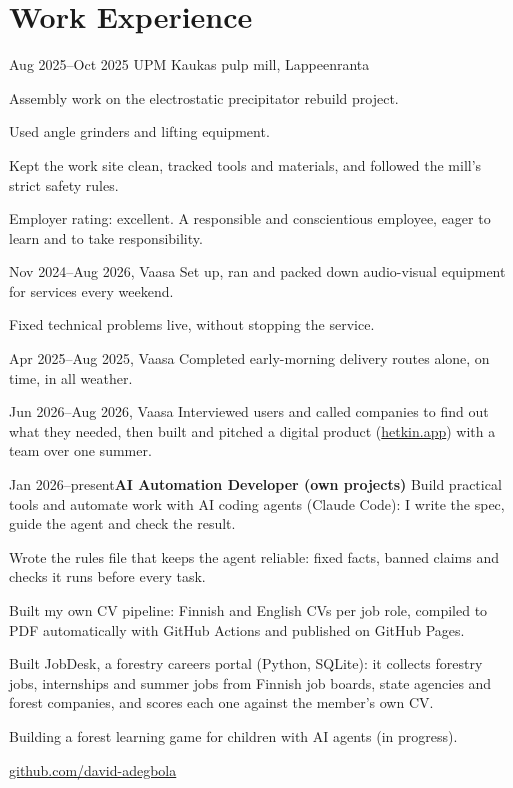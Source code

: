 \documentclass[a4paper,11pt]{article}
\begin{document}
\section{Work Experience}
\begin{cventry}{Aug 2025--Oct 2025}{}
  UPM Kaukas pulp mill, Lappeenranta\par
  Assembly work on the electrostatic precipitator rebuild project.\par
  Used angle grinders and lifting equipment.\par
  Kept the work site clean, tracked tools and materials, and followed the mill's strict safety rules.\par
  Employer rating: excellent. A responsible and conscientious employee, eager to learn and to take responsibility.
\end{cventry}
\begin{cventry}{Nov 2024--Aug 2026}{, Vaasa}
  Set up, ran and packed down audio-visual equipment for services every weekend.\par
  Fixed technical problems live, without stopping the service.
\end{cventry}
\begin{cventry}{Apr 2025--Aug 2025}{, Vaasa}
  Completed early-morning delivery routes alone, on time, in all weather.
\end{cventry}
\begin{cventry}{Jun 2026--Aug 2026}{, Vaasa}
  Interviewed users and called companies to find out what they needed, then built and pitched a digital product (\href{https://hetkin.app}{hetkin.app}) with a team over one summer.
\end{cventry}
\begin{cventry}{Jan 2026--present}{\textbf{AI Automation Developer (own projects)}}
  Build practical tools and automate work with AI coding agents (Claude Code): I write the spec, guide the agent and check the result.\par
  Wrote the rules file that keeps the agent reliable: fixed facts, banned claims and checks it runs before every task.\par
  Built my own CV pipeline: Finnish and English CVs per job role, compiled to PDF automatically with GitHub Actions and published on GitHub Pages.\par
  Built JobDesk, a forestry careers portal (Python, SQLite): it collects forestry jobs, internships and summer jobs from Finnish job boards, state agencies and forest companies, and scores each one against the member's own CV.\par
  Building a forest learning game for children with AI agents (in progress).\par
  \faGithub{} \href{https://github.com/david-adegbola}{github.com/david-adegbola}
\end{cventry}
\end{document}
